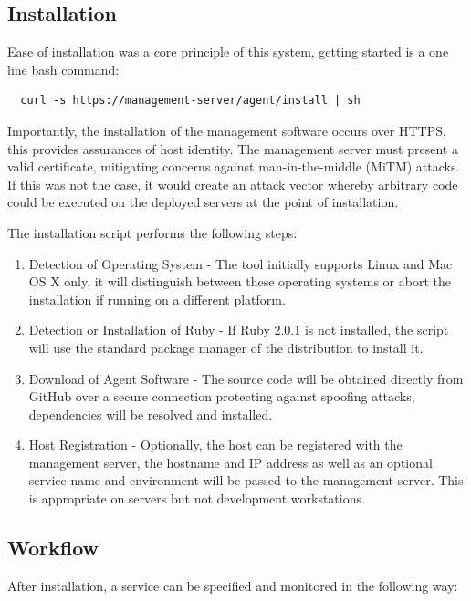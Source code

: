 \documentclass{cshonours}
\begin{document}
\subsection{Installation}

Ease of installation was a core principle of this system, getting started is a one line bash command:

\begin{verbatim}
  curl -s https://management-server/agent/install | sh
\end{verbatim}

Importantly, the installation of the management software occurs over HTTPS, this provides assurances of host identity. The management server must present a valid certificate, mitigating concerns against man-in-the-middle (MiTM) attacks. If this was not the case, it would create an attack vector whereby arbitrary code could be executed on the deployed servers at the point of installation.

The installation script performs the following steps:

\begin{enumerate}
  \item{Detection of Operating System} - The tool initially supports Linux and Mac OS X only, it will distinguish between these operating systems or abort the installation if running on a different platform.
  \item{Detection or Installation of Ruby} - If Ruby 2.0.1 is not installed, the script will use the standard package manager of the distribution to install it.
  \item{Download of Agent Software} - The source code will be obtained directly from GitHub over a secure connection protecting against spoofing attacks, dependencies will be resolved and installed.
  \item{Host Registration} - Optionally, the host can be registered with the management server, the hostname and IP address as well as an optional service name and environment will be passed to the management server. This is appropriate on servers but not development workstations.
\end{enumerate}

\subsection{Workflow}

After installation, a service can be specified and monitored in the following way:
\end{document}
